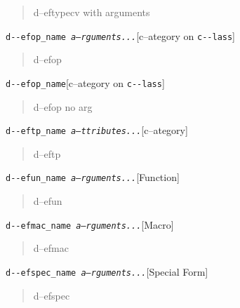 \documentclass{book}
\begin{document}
%
\begin{quote}
d--eftypecv with arguments
\end{quote}

\noindent\texttt{d{-}{-}efop\_name \EmbracOn{}\textnormal{\textsl{a--rguments...}}\EmbracOff{}}\hfill[c--ategory on \texttt{c{-}{-}lass}]



%
\begin{quote}
d--efop
\end{quote}

\noindent\texttt{d{-}{-}efop\_name}\hfill[c--ategory on \texttt{c{-}{-}lass}]



%
\begin{quote}
d--efop no arg
\end{quote}

\noindent\texttt{d{-}{-}eftp\_name \EmbracOn{}\textnormal{\textsl{a--ttributes...}}\EmbracOff{}}\hfill[c--ategory]



%
\begin{quote}
d--eftp
\end{quote}

\noindent\texttt{d{-}{-}efun\_name \EmbracOn{}\textnormal{\textsl{a--rguments...}}\EmbracOff{}}\hfill[Function]



%
\begin{quote}
d--efun
\end{quote}

\noindent\texttt{d{-}{-}efmac\_name \EmbracOn{}\textnormal{\textsl{a--rguments...}}\EmbracOff{}}\hfill[Macro]



%
\begin{quote}
d--efmac
\end{quote}

\noindent\texttt{d{-}{-}efspec\_name \EmbracOn{}\textnormal{\textsl{a--rguments...}}\EmbracOff{}}\hfill[Special Form]



%
\begin{quote}
d--efspec
\end{quote}
\end{document}
